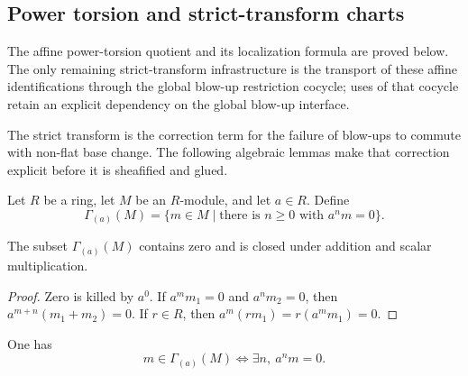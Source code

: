\subsection{Power torsion and strict-transform charts}

The affine power-torsion quotient and its localization formula are proved
below.  The only remaining strict-transform infrastructure is the transport
of these affine identifications through the global blow-up restriction
cocycle; uses of that cocycle retain an explicit dependency on the global
blow-up interface.

The strict transform is the correction term for the failure of blow-ups to
commute with non-flat base change.  The following algebraic lemmas make that
correction explicit before it is sheafified and glued.

\begin{definition}
  \label{def:nagata-power-torsion}
  \leanok

  Let $R$ be a ring, let $M$ be an $R$-module, and let $a\in R$.  Define
  \[
    \Gamma_{(a)}(M)
      =\{m\in M\mid \text{there is }n\geq0\text{ with }a^nm=0\}.
  \]
\end{definition}

\begin{lemma}
  \label{lemma:nagata-power-torsion-submodule}
  \leanok

  The subset $\Gamma_{(a)}(M)$ contains zero and is closed under addition and
  scalar multiplication.
\end{lemma}

\begin{proof}
  \leanok
  Zero is killed by $a^0$.  If $a^mm_1=0$ and $a^nm_2=0$, then
  $a^{m+n}(m_1+m_2)=0$.  If $r\in R$, then
  $a^m(rm_1)=r(a^mm_1)=0$.
\end{proof}

\begin{lemma}
  \label{lemma:nagata-mem-power-torsion}
  \leanok

  One has
  \[
    m\in\Gamma_{(a)}(M)
      \Longleftrightarrow
    \exists n,\ a^nm=0.
  \]
\end{lemma}

